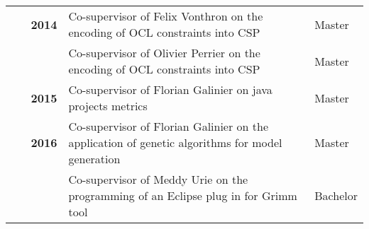 \documentclass{article} %
\begin{document}







\begin{tabular}{r @{~~$\rangle$~} p{} l}

\textbf{~~~2014} & Co-supervisor of Felix Vonthron on the encoding of OCL constraints into CSP & Master \\
                    & Co-supervisor of Olivier Perrier on the encoding of OCL constraints into CSP & Master \\

\textbf{2015} & Co-supervisor of Florian Galinier on java projects metrics & Master \\
            
          
\textbf{2016} & Co-supervisor of Florian Galinier on the application of genetic algorithms for model generation & Master \\
              & Co-supervisor of Meddy Urie on the programming of an Eclipse plug in for Grimm tool & Bachelor \\
\end{tabular}


\end{document}
